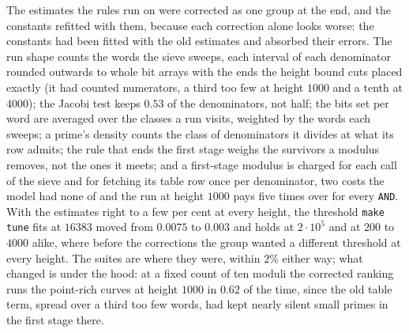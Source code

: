\documentclass[12pt,a4paper,oneside]{amsart}
\begin{document}
The estimates the rules run on were corrected as one group at the end, and
the constants refitted with them, because each correction alone looks worse:
the constants had been fitted with the old estimates and absorbed their
errors. The run shape counts the words the sieve sweeps, each interval of
each denominator rounded outwards to whole bit arrays with the ends the
height bound cuts placed exactly (it had counted numerators, a third too few
at height $1000$ and a tenth at $4000$); the Jacobi test keeps $0.53$ of the
denominators, not half; the bits set per word are averaged over the classes a
run visits, weighted by the words each sweeps; a prime's density counts the
class of denominators it divides at what its row admits; the rule that ends
the first stage weighs the survivors a modulus removes, not the ones it
meets; and a first-stage modulus is charged for each call of the sieve and
for fetching its table row once per denominator, two costs the model had none
of and the run at height $1000$ pays five times over for every \texttt{AND}.
With the estimates right to a few per cent at every height, the threshold
\texttt{make tune} fits at $16383$ moved from $0.0075$ to $0.003$ and holds
at $2\cdot 10^5$ and at $200$ to $4000$ alike, where before the corrections
the group wanted a different threshold at every height. The suites are where
they were, within $2\%$ either way; what changed is under the hood: at a
fixed count of ten moduli the corrected ranking runs the point-rich curves at
height $1000$ in $0.62$ of the time, since the old table term, spread over a
third too few words, had kept nearly silent small primes in the first stage
there.
\end{document}
